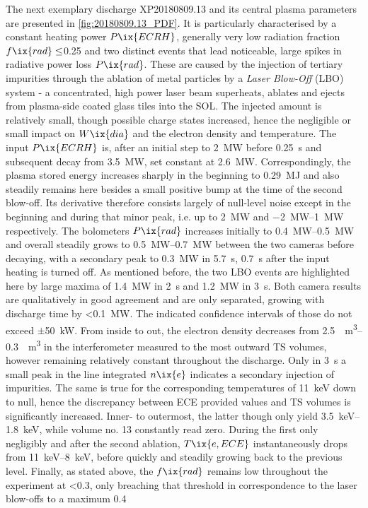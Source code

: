             The next exemplary discharge XP20180809.13 and its central plasma parameters are presented in \cref{fig:20180809.13_PDF}. It is particularly characterised by a constant heating power $P\ix{ECRH}$, generally very low radiation fraction $f\ix{rad}\le$\SI{0.25}{\arbitraryunit} and two distinct events that lead noticeable, large spikes in radiative power loss $P\ix{rad}$. These are caused by the injection of tertiary impurities through the ablation of metal particles by a \textit{Laser Blow-Off} (LBO) system - a concentrated, high power laser beam superheats, ablates and ejects from plasma-side coated glass tiles into the SOL. The injected amount is relatively small, though possible charge states increased, hence the negligible or small impact on $W\ix{dia}$ and the electron density and temperature. The input $P\ix{ECRH}$ is, after an initial step to \SI{2}{\mega\watt} before \SI{0.25}{\second} and subsequent decay from \SI{3.5}{\mega\watt}, set constant at \SI{2.6}{\mega\watt}. Correspondingly, the plasma stored energy increases sharply in the beginning to \SI{0.29}{\mega\joule} and also steadily remains here besides a small positive bump at the time of the second blow-off. Its derivative therefore consists largely of null-level noise except in the beginning and during that minor peak, i.e. up to \SI{2}{\mega\watt} and \SIrange{-2}{1}{\mega\watt} respectively. The bolometers $P\ix{rad}$ increases initially to \SIrange{0.4}{0.5}{\mega\watt} and overall steadily grows to \SIrange{0.5}{0.7}{\mega\watt} between the two cameras before decaying, with a secondary peak to \SI{0.3}{\mega\watt} in \SI{5.7}{\second}, \SI{0.7}{\second} after the input heating is turned off. As mentioned before, the two LBO events are highlighted here by large maxima of \SI{1.4}{\mega\watt} in \SI{2}{\second} and \SI{1.2}{\mega\watt} in \SI{3}{\second}. Both camera results are qualitatively in good agreement and are only separated, growing with discharge time by <\SI{0.1}{\mega\watt}. The indicated confidence intervals of those do not exceed $\pm$\SI{50}{\kilo\watt}. From inside to out, the electron density decreases from \SIrange{2.5}{0.3}{\per\cubic\meter} in the interferometer measured to the most outward TS volumes, however remaining relatively constant throughout the discharge. Only in \SI{3}{\second} a small peak in the line integrated $n\ix{e}$ indicates a secondary injection of impurities. The same is true for the corresponding temperatures of \SI{11}{\kilo\electronvolt} down to null, hence the discrepancy between ECE provided values and TS volumes is significantly increased. Inner- to outermost, the latter though only yield \SIrange{3.5}{1.8}{\kilo\electronvolt}, while volume no. 13 constantly read zero. During the first only negligibly and after the second ablation, $T\ix{e,ECE}$ instantaneously drops from \SIrange{11}{8}{\kilo\electronvolt}, before quickly and steadily growing back to the previous level. Finally, as stated above, the $f\ix{rad}$ remains low throughout the experiment at <\SI{0.3}{\arbitraryunit}, only breaching that threshold in correspondence to the laser blow-offs to a maximum \SI{0.4}{\arbitraryunit}\\%
